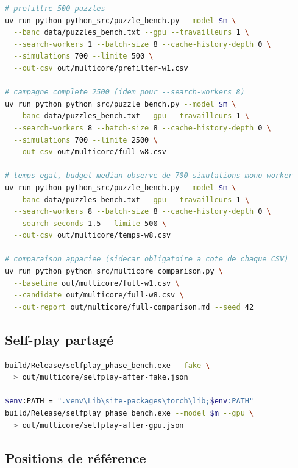 \begin{lstlisting}[language=bash, caption={Pr\'efiltre, campagne compl\`ete et
temps \'egal.}]
# prefiltre 500 puzzles
uv run python python_src/puzzle_bench.py --model $m \
  --banc data/puzzles_bench.txt --gpu --travailleurs 1 \
  --search-workers 1 --batch-size 8 --cache-history-depth 0 \
  --simulations 700 --limite 500 \
  --out-csv out/multicore/prefilter-w1.csv

# campagne complete 2500 (idem pour --search-workers 8)
uv run python python_src/puzzle_bench.py --model $m \
  --banc data/puzzles_bench.txt --gpu --travailleurs 1 \
  --search-workers 8 --batch-size 8 --cache-history-depth 0 \
  --simulations 700 --limite 2500 \
  --out-csv out/multicore/full-w8.csv

# temps egal, budget median observe de 700 simulations mono-worker
uv run python python_src/puzzle_bench.py --model $m \
  --banc data/puzzles_bench.txt --gpu --travailleurs 1 \
  --search-workers 8 --batch-size 8 --cache-history-depth 0 \
  --search-seconds 1.5 --limite 500 \
  --out-csv out/multicore/temps-w8.csv

# comparaison appariee (sidecar obligatoire a cote de chaque CSV)
uv run python python_src/multicore_comparison.py \
  --baseline out/multicore/full-w1.csv \
  --candidate out/multicore/full-w8.csv \
  --out-report out/multicore/full-comparison.md --seed 42
\end{lstlisting}

\subsection*{Self-play partag\'e}

\begin{lstlisting}[language=bash, caption={Banc self-play. Le dossier
\code{torch/lib} doit \^etre dans \code{PATH} pour que le provider CUDA trouve
\code{cublasLt}.}]
build/Release/selfplay_phase_bench.exe --fake \
  > out/multicore/selfplay-after-fake.json

$env:PATH = ".venv\Lib\site-packages\torch\lib;$env:PATH"
build/Release/selfplay_phase_bench.exe --model $m --gpu \
  > out/multicore/selfplay-after-gpu.json
\end{lstlisting}

\subsection*{Positions de r\'ef\'erence}

